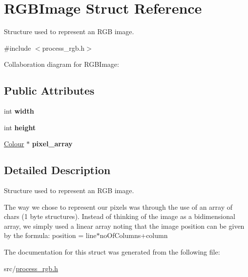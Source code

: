 \hypertarget{structRGBImage}{}\section{R\+G\+B\+Image Struct Reference}
\label{structRGBImage}


Structure used to represent an R\+GB image.  




{\ttfamily \#include $<$process\+\_\+rgb.\+h$>$}



Collaboration diagram for R\+G\+B\+Image\+:
\subsection*{Public Attributes}
\begin{DoxyCompactItemize}
\item 
\mbox{\label{structRGBImage_a9dfbf4e8564ddc40f933633e81a3305a}} 
int {\bfseries width}
\item 
\mbox{\label{structRGBImage_a5c8d29a71b54a7bece6c2c0759ac4425}} 
int {\bfseries height}
\item 
\mbox{\label{structRGBImage_a27f9fdf29314557d28a81de72e262a3d}} 
\hyperlink{structColour}{Colour} $\ast$ {\bfseries pixel\+\_\+array}
\end{DoxyCompactItemize}


\subsection{Detailed Description}
Structure used to represent an R\+GB image. 

The way we chose to represent our pixels was through the use of an array of chars (1 byte structures). Instead of thinking of the image as a bidimensional array, we simply used a linear array noting that the image position can be given by the formula\+: position = line$\ast$no\+Of\+Columns+column 

The documentation for this struct was generated from the following file\+:\begin{DoxyCompactItemize}
\item 
src/\hyperlink{process__rgb_8h}{process\+\_\+rgb.\+h}\end{DoxyCompactItemize}
